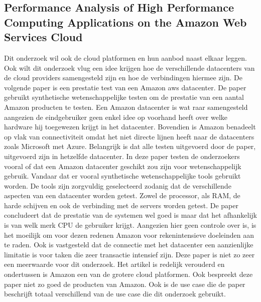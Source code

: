 \subsection{Performance Analysis of High Performance Computing Applications on the Amazon Web Services Cloud}
Dit onderzoek wil ook de cloud platformen en hun aanbod naast elkaar leggen. Ook wilt dit onderzoek vlug een idee krijgen hoe de verschillende datacenters van de cloud providers samengesteld zijn en hoe de verbindingen hiermee zijn. De volgende paper \autocite{Jackson2010}is een prestatie test van een Amazon aws datacenter.
\newline
\newline
De paper \autocite{Jackson2010} gebruikt synthetische wetenschappelijke testen om de prestatie van een aantal Amazon producten te testen. Een Amazon datacenter is wat raar samengesteld aangezien de eindgebruiker geen enkel idee op voorhand heeft over welke hardware hij toegewezen krijgt in het datacenter. Bovendien is Amazon benadeelt op vlak van connectiviteit omdat het niet directe lijnen heeft naar de datacenters zoals Microsoft met Azure. Belangrijk is dat alle testen uitgevoerd door de paper, uitgevoerd zijn in hetzelfde datacenter.
\newline
\newline
In deze paper \autocite{Jackson2010} testen de onderzoekers vooral of dat een Amazon datacenter geschikt zou zijn voor wetenschappelijk gebruik. Vandaar dat er vooral synthetische wetenschappelijke tools gebruikt worden. De tools zijn zorgvuldig geselecteerd zodanig dat de verschillende aspecten van een datacenter worden getest. Zowel de processor, als RAM, de harde schijven en ook de verbinding met de servers worden getest.
\newline
\newline
De paper \autocite{Jackson2010} concludeert dat de prestatie van de systemen wel goed is maar dat het afhankelijk is van welk merk CPU de gebruiker krijgt. Aangezien hier geen controle over is, is het moeilijk om voor dezen redenen Amazon voor rekenintensieve doeleinden aan te raden. Ook is vastgesteld dat de connectie met het datacenter een aanzienlijke limitatie is voor taken die zeer transactie intensief zijn.
\newline
\newline
Deze paper \autocite{Jackson2010} is niet zo zeer een meerwaarde voor dit onderzoek. Het artikel is redelijk verouderd en ondertussen is Amazon een van de grotere cloud platformen. Ook bespreekt deze paper niet zo goed de producten van Amazon. Ook is de use case die de paper beschrijft totaal verschillend van de use case die dit onderzoek gebruikt. 
\newline
\newline

